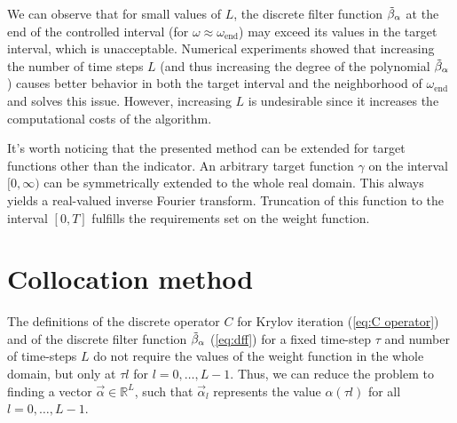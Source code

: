 \documentclass[a4paper,11pt,bibliography=totoc,listof=totoc,headinclude=true,cleardoublepage=empty,oneside]{scrbook}
\newcommand{\R}{\mathbb{R}}
\newcommand{\dff}{\Tilde{\beta}_\alpha}
\newcommand{\e}{\mathrm{end}}
\renewcommand{\eqref}[1]{(\ref{#1})}
\begin{document}

We can observe that for small values of $L$, the discrete filter function $\dff$ at the end of the controlled interval (for $\omega \approx \omega_\e$) may exceed its values in the target interval, which is unacceptable. Numerical experiments showed that increasing the number of time steps $L$ (and thus increasing the degree of the polynomial $\dff$) causes better behavior in both the target interval and the neighborhood of $\omega_\e$ and solves this issue. However, increasing $L$ is undesirable since it increases the computational costs of the algorithm.

It's worth noticing that the presented method can be extended for target functions other than the indicator. An arbitrary target function $\gamma$ on the interval $[0, \infty)$ can be symmetrically extended to the whole real domain. This always yields a real-valued inverse Fourier transform. Truncation of this function to the interval $[0, T]$ fulfills the requirements set on the weight function.

\section{Collocation method}\label{section:collocation}
The definitions of the discrete operator $C$ for Krylov iteration \eqref{eq:C operator} and of the discrete filter function $\dff$ \eqref{eq:dff} for a fixed time-step $\tau$ and number of time-steps $L$ do not require the values of the weight function in the whole domain, but only at $\tau l$ for $l=0, \dots, L-1$. Thus, we can reduce the problem to finding a vector $\Vec{\alpha} \in \R^L$, such that $\Vec{\alpha}_l$ represents the value $\alpha(\tau l)$ for all $l=0, \dots, L-1$.
\end{document}
